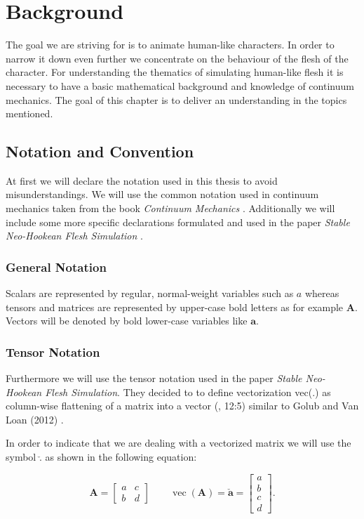 \chapter{Background} \label{c:Background}
The goal we are striving for is to animate human-like characters. In order to narrow it down even further we concentrate on the behaviour of the flesh of the character. 
For understanding the thematics of simulating human-like flesh it is necessary to have a basic mathematical background and knowledge of continuum mechanics. The goal of this chapter is to deliver an understanding in the topics mentioned.


\section{Notation and Convention}
At first we will declare the notation used in this thesis to avoid misunderstandings. We will use the common notation used in continuum mechanics taken from the book \textit{Continuum Mechanics} \cite{Spencer1980}. Additionally we will include some more specific declarations formulated and used in the paper \textit{Stable Neo-Hookean Flesh Simulation} \cite{Smith:2018:SNF:3191713.3180491}. 


\subsection{General Notation}
Scalars are represented by regular, normal-weight variables such as $a$ whereas 
tensors and matrices are represented by upper-case bold letters as for example $\textbf{A}$. Vectors will be denoted by bold lower-case variables like $\textbf{a}$. 


\subsection{Tensor Notation}
Furthermore we will use the tensor notation used in the paper \textit{Stable Neo-Hookean Flesh Simulation}. They decided to to define vectorization vec(.) as column-wise flattening of a matrix into a vector (\cite{Smith:2018:SNF:3191713.3180491}, 12:5) similar to Golub and Van Loan (2012) \cite{golub2012matrix}.

In order to indicate that we are dealing with a vectorized matrix we will use the symbol $\check{.}$ as shown in the following equation:

\[
\textbf{A} = \begin{bmatrix} a & c \\ b & d \end{bmatrix} \qquad \operatorname{vec}(\textbf{A}) = \boldsymbol{\check{a}} = \begin{bmatrix} a \\ b \\ c \\ d \end{bmatrix}.
\]

